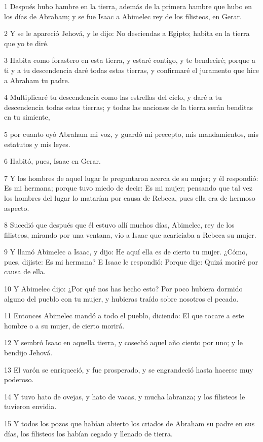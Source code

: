 \par 1 Después hubo hambre en la tierra, además de la primera hambre que hubo en los días de Abraham; y se fue Isaac a Abimelec rey de los filisteos, en Gerar.
\par 2 Y se le apareció Jehová, y le dijo: No desciendas a Egipto; habita en la tierra que yo te diré.
\par 3 Habita como forastero en esta tierra, y estaré contigo, y te bendeciré; porque a ti y a tu descendencia daré todas estas tierras, y confirmaré el juramento que hice a Abraham tu padre.
\par 4 Multiplicaré tu descendencia como las estrellas del cielo, y daré a tu descendencia todas estas tierras; y todas las naciones de la tierra serán benditas en tu simiente,
\par 5 por cuanto oyó Abraham mi voz, y guardó mi precepto, mis mandamientos, mis estatutos y mis leyes.
\par 6 Habitó, pues, Isaac en Gerar.
\par 7 Y los hombres de aquel lugar le preguntaron acerca de su mujer; y él respondió: Es mi hermana; porque tuvo miedo de decir: Es mi mujer; pensando que tal vez los hombres del lugar lo matarían por causa de Rebeca, pues ella era de hermoso aspecto.
\par 8 Sucedió que después que él estuvo allí muchos días, Abimelec, rey de los filisteos, mirando por una ventana, vio a Isaac que acariciaba a Rebeca su mujer.
\par 9 Y llamó Abimelec a Isaac, y dijo: He aquí ella es de cierto tu mujer. ¿Cómo, pues, dijiste: Es mi hermana? E Isaac le respondió: Porque dije: Quizá moriré por causa de ella.
\par 10 Y Abimelec dijo: ¿Por qué nos has hecho esto? Por poco hubiera dormido alguno del pueblo con tu mujer, y hubieras traído sobre nosotros el pecado.
\par 11 Entonces Abimelec mandó a todo el pueblo, diciendo: El que tocare a este hombre o a su mujer, de cierto morirá.
\par 12 Y sembró Isaac en aquella tierra, y cosechó aquel año ciento por uno; y le bendijo Jehová.
\par 13 El varón se enriqueció, y fue prosperado, y se engrandeció hasta hacerse muy poderoso.
\par 14 Y tuvo hato de ovejas, y hato de vacas, y mucha labranza; y los filisteos le tuvieron envidia.
\par 15 Y todos los pozos que habían abierto los criados de Abraham su padre en sus días, los filisteos los habían cegado y llenado de tierra.
